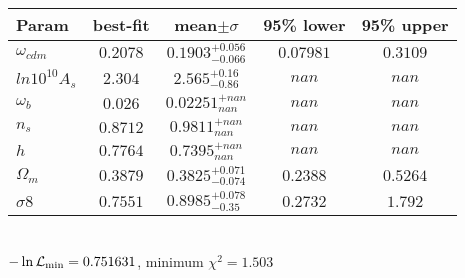 \begin{tabular}{|l|c|c|c|c|} 
 \hline 
Param & best-fit & mean$\pm\sigma$ & 95\% lower & 95\% upper \\ \hline 
$\omega_{cdm }$ &$0.2078$ & $0.1903_{-0.066}^{+0.056}$ & $0.07981$ & $0.3109$ \\ 
$ln10^{10}A_{s }$ &$2.304$ & $2.565_{-0.86}^{+0.16}$ & $nan$ & $nan$ \\ 
$\omega_{b }$ &$0.026$ & $0.02251_{nan}^{+nan}$ & $nan$ & $nan$ \\ 
$n_{s }$ &$0.8712$ & $0.9811_{nan}^{+nan}$ & $nan$ & $nan$ \\ 
$h$ &$0.7764$ & $0.7395_{nan}^{+nan}$ & $nan$ & $nan$ \\ 
$\Omega_{m }$ &$0.3879$ & $0.3825_{-0.074}^{+0.071}$ & $0.2388$ & $0.5264$ \\ 
$\sigma8$ &$0.7551$ & $0.8985_{-0.35}^{+0.078}$ & $0.2732$ & $1.792$ \\ 
\hline 
 \end{tabular} \\ 
$-\ln{\cal L}_\mathrm{min} =0.751631$, minimum $\chi^2=1.503$ \\ 
